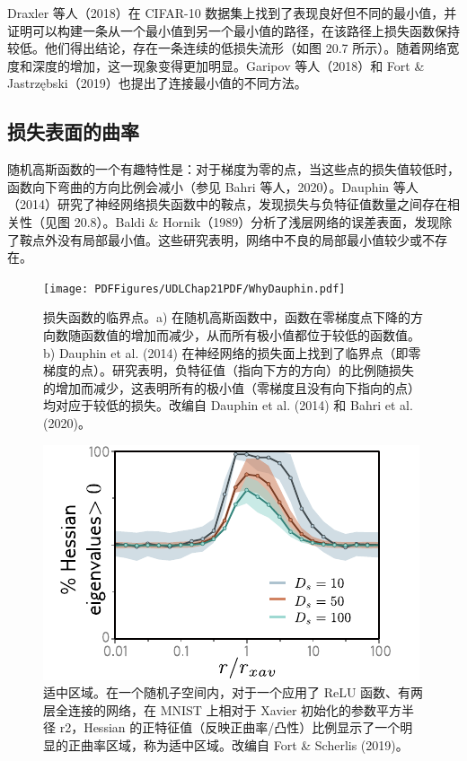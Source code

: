 \documentclass[lang=cn,newtx,10pt,scheme=chinese]{elegantbook}
\begin{document}
Draxler 等人（2018）在 CIFAR-10 数据集上找到了表现良好但不同的最小值，并证明可以构建一条从一个最小值到另一个最小值的路径，在该路径上损失函数保持较低。他们得出结论，存在一条连续的低损失流形（如图 20.7 所示）。随着网络宽度和深度的增加，这一现象变得更加明显。Garipov 等人（2018）和 Fort \& Jastrzębski（2019）也提出了连接最小值的不同方法。

\subsection{损失表面的曲率}
随机高斯函数的一个有趣特性是：对于梯度为零的点，当这些点的损失值较低时，函数向下弯曲的方向比例会减小（参见 Bahri 等人，2020）。Dauphin 等人（2014）研究了神经网络损失函数中的鞍点，发现损失与负特征值数量之间存在相关性（见图 20.8）。Baldi \& Hornik（1989）分析了浅层网络的误差表面，发现除了鞍点外没有局部最小值。这些研究表明，网络中不良的局部最小值较少或不存在。

\begin{figure}[ht!]
\centering
\texttt{[image: PDFFigures/UDLChap21PDF/WhyDauphin.pdf]}
\caption{损失函数的临界点。a) 在随机高斯函数中，函数在零梯度点下降的方向数随函数值的增加而减少，从而所有极小值都位于较低的函数值。b) Dauphin et al. (2014) 在神经网络的损失面上找到了临界点（即零梯度的点）。研究表明，负特征值（指向下方的方向）的比例随损失的增加而减少，这表明所有的极小值（零梯度且没有向下指向的点）均对应于较低的损失。改编自 Dauphin et al. (2014) 和 Bahri et al. (2020)。}
\end{figure}

\begin{figure}[ht!]
\centering
\includegraphics[width=0.7\linewidth]{PDFFigures/UDLChap21PDF/WhyGoldilocks.pdf}
\caption{适中区域。在一个随机子空间内，对于一个应用了 ReLU 函数、有两层全连接的网络，在 MNIST 上相对于 Xavier 初始化的参数平方半径 r2，Hessian 的正特征值（反映正曲率/凸性）比例显示了一个明显的正曲率区域，称为适中区域。改编自 Fort \& Scherlis (2019)。}
\end{figure}
\end{document}
